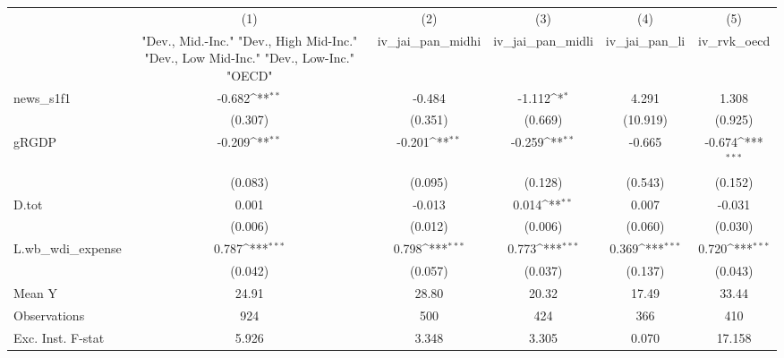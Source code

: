{
\def\sym#1{\ifmmode^{#1}\else\(^{#1}\)\fi}
\begin{tabular}{l*{5}{c}}
\toprule
            &\multicolumn{1}{c}{(1)}&\multicolumn{1}{c}{(2)}&\multicolumn{1}{c}{(3)}&\multicolumn{1}{c}{(4)}&\multicolumn{1}{c}{(5)}\\
            &\multicolumn{1}{c}{ "Dev., Mid.-Inc." "Dev., High Mid-Inc." "Dev., Low Mid-Inc." "Dev., Low-Inc." "OECD" }&\multicolumn{1}{c}{iv\_jai\_pan\_midhi}&\multicolumn{1}{c}{iv\_jai\_pan\_midli}&\multicolumn{1}{c}{iv\_jai\_pan\_li}&\multicolumn{1}{c}{iv\_rvk\_oecd}\\
\midrule
news\_s1f1   &      -0.682\sym{**} &      -0.484         &      -1.112\sym{*}  &       4.291         &       1.308         \\
            &     (0.307)         &     (0.351)         &     (0.669)         &    (10.919)         &     (0.925)         \\
\addlinespace
gRGDP       &      -0.209\sym{**} &      -0.201\sym{**} &      -0.259\sym{**} &      -0.665         &      -0.674\sym{***}\\
            &     (0.083)         &     (0.095)         &     (0.128)         &     (0.543)         &     (0.152)         \\
\addlinespace
D.tot       &       0.001         &      -0.013         &       0.014\sym{**} &       0.007         &      -0.031         \\
            &     (0.006)         &     (0.012)         &     (0.006)         &     (0.060)         &     (0.030)         \\
\addlinespace
L.wb\_wdi\_expense&       0.787\sym{***}&       0.798\sym{***}&       0.773\sym{***}&       0.369\sym{***}&       0.720\sym{***}\\
            &     (0.042)         &     (0.057)         &     (0.037)         &     (0.137)         &     (0.043)         \\
\midrule
Mean Y      &       24.91         &       28.80         &       20.32         &       17.49         &       33.44         \\
Observations&         924         &         500         &         424         &         366         &         410         \\
Exc. Inst. F-stat&       5.926         &       3.348         &       3.305         &       0.070         &      17.158         \\
\bottomrule
\end{tabular}
}
